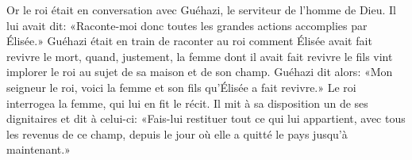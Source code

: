 Or le roi était en conversation avec Guéhazi, le serviteur de l’homme de Dieu.
Il lui avait dit:
	«Raconte-moi donc toutes les grandes actions accomplies par Élisée.»
Guéhazi était en train de raconter au roi comment Élisée avait fait revivre le mort,
	quand, justement, la femme dont il avait fait revivre le fils
		vint implorer le roi au sujet de sa maison et de son champ.
Guéhazi dit alors:
	«Mon seigneur le roi, voici la femme et son fils qu’Élisée a fait revivre.»
Le roi interrogea la femme, qui lui en fit le récit.
Il mit à sa disposition un de ses dignitaires et dit à celui-ci:
	«Fais-lui restituer tout ce qui lui appartient, avec tous les revenus de ce champ,
	depuis le jour où elle a quitté le pays jusqu’à maintenant.»
